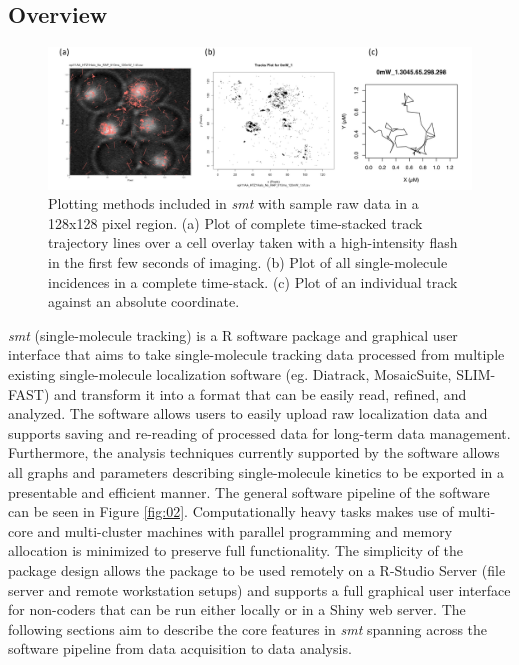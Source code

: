 \documentclass{bioinfo}
\begin{document}
\subsection{Overview}

\begin{figure}[t]
\centerline{\includegraphics[width=180mm]{plot.png}}
\caption{Plotting methods included in \textit{smt} with sample raw data in a 128x128 pixel region. (a) Plot of complete time-stacked track trajectory lines over a cell overlay taken with a high-intensity flash in the first few seconds of imaging. (b) Plot of all single-molecule incidences in a complete time-stack. (c) Plot of an individual track against an absolute coordinate.}\label{fig:04}
\end{figure}

\textit{smt} (single-molecule tracking) is a R software package and graphical user interface that aims to take single-molecule tracking data processed from multiple existing single-molecule localization software (eg. Diatrack, MosaicSuite, SLIM-FAST) and transform it into a format that can be easily read, refined, and analyzed. The software allows users to easily upload raw localization data and supports saving and re-reading of processed data for long-term data management. Furthermore, the analysis techniques currently supported by the software allows all graphs and parameters describing single-molecule kinetics to be exported in a presentable and efficient manner. The general software pipeline of the software can be seen in Figure \ref{fig:02}. Computationally heavy tasks makes use of multi-core and multi-cluster machines with parallel programming and memory allocation is minimized to preserve full functionality. The simplicity of the package design allows the package to be used remotely on a R-Studio Server (file server and remote workstation setups) and supports a full graphical user interface for non-coders that can be run either locally or in a Shiny web server. The following sections aim to describe the core features in \textit{smt} spanning across the software pipeline from data acquisition to data analysis.
\end{document}
